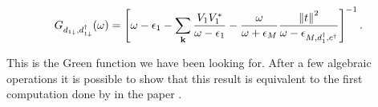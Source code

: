 \begin{equation}
    G_{d_{1\downarrow},d_{1\downarrow}^{\dagger}}(\omega)=\left[\omega-\epsilon_{1}-\sum_{\mathbf{k}}\frac{V_{1}V_{1}^{*}}{\omega-\epsilon_{1}}-\frac{\omega}{\omega+\epsilon_{M}}\frac{\left\Vert t\right\Vert ^{2}}{\omega -\epsilon_{M,d_1^\dagger,c^\dagger}}\right]^{-1}.
\end{equation}

This is the Green function we have been looking for. After a few algebraic operations it is possible to show that this result is equivalent to the first computation done by \citeauthor{liu_detecting_2011}  in the paper \cite{liu_detecting_2011}. 

